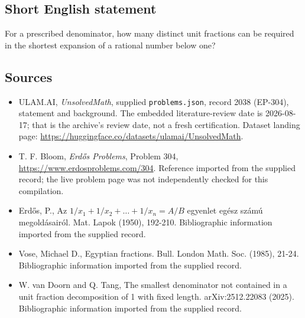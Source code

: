 \documentclass[11pt,a4paper]{article}
\begin{document}
\subsection{Short English statement}

For a prescribed denominator, how many distinct unit fractions can be required in the shortest expansion of a rational number below one?

\subsection{Sources}

{\small

\begin{itemize}

\item[\hypertarget{source:2038:1}{S1}] ULAM.AI, \emph{UnsolvedMath}, supplied \texttt{problems.json}, record 2038 (EP-304), statement and background. The embedded literature-review date is 2026-08-17; that is the archive’s review date, not a fresh certification. Dataset landing page: \url{https://huggingface.co/datasets/ulamai/UnsolvedMath}.

\item[\hypertarget{source:2038:2}{S2}] T. F. Bloom, \emph{Erdős Problems}, Problem 304, \url{https://www.erdosproblems.com/304}. Reference imported from the supplied record; the live problem page was not independently checked for this compilation.

\item[\hypertarget{source:2038:3}{S3}] Erd\H{o}s, P., Az $1/x_1 + 1/x_2 + \ldots + 1/x_n =A/B$ egyenlet eg\'{e}sz sz\'{a}m\'{u} megold\'{a}sair\'{o}l. Mat. Lapok (1950), 192-210. Bibliographic information imported from the supplied record.

\item[\hypertarget{source:2038:4}{S4}] Vose, Michael D., Egyptian fractions. Bull. London Math. Soc. (1985), 21-24. Bibliographic information imported from the supplied record.

\item[\hypertarget{source:2038:5}{S5}] W. van Doorn and Q. Tang, The smallest denominator not contained in a unit fraction decomposition of 1 with fixed length. arXiv:2512.22083 (2025). Bibliographic information imported from the supplied record.

\end{itemize}

}

\label{end:2038}
\end{document}
